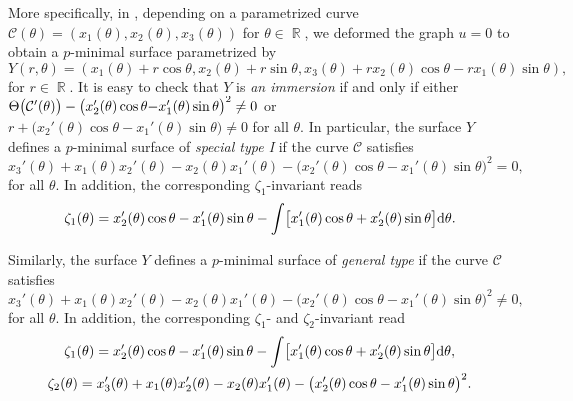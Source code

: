 \documentclass[pdftex]{sigma}
\numberwithin{equation}{section}
\DeclareMathOperator{\R}{\mathbb R}
\begin{document}
More specifically, in \cite[Section 9]{ChiuH/LiuH:2022}, depending on a parametrized curve $\mathcal{C}(\theta)=(x_{1}(\theta), x_{2}(\theta), x_{3}(\theta))$ for $\theta\in\R$, we deformed the graph $u=0$ to obtain a $p$-minimal surface parametrized by
 \begin{equation*}%
 Y(r,\theta)=(x_{1}(\theta)+r\cos{\theta},x_{2}(\theta)+r\sin{\theta},x_{3}(\theta)+rx_{2}(\theta)\cos{\theta}-rx_{1}(\theta)\sin{\theta}),
 \end{equation*}
for $r\in\R$. It is easy to check that $Y$ is \emph{an immersion} if and only if either $\Theta\bigl(\mathcal{C}'(\theta)\bigr)-\bigl(x_{2}'(\theta)\cos{\theta}\smash{-x_{1}'(\theta)\sin{\theta}\bigr)^{2}\neq 0}$ or $r+\bigl(x_{2}'(\theta)\cos{\theta}-x_{1}'(\theta)\sin{\theta}\bigr)\neq 0$ for all $\theta$.
In particular, the surface $Y$ defines a $p$-minimal surface of \emph{special type I} if the curve $\mathcal{C}$ satisfies
\begin{equation*}%
x_{3}'(\theta)+x_{1}(\theta)x_{2}'(\theta)-x_{2}(\theta)x_{1}'(\theta)-\bigl(x_{2}'(\theta)\cos{\theta}-x_{1}'(\theta)\sin{\theta}\bigr)^2=0,
\end{equation*}
for all $\theta$.
In addition, the corresponding $\zeta_{1}$-invariant \cite[formula~(9.9)]{ChiuH/LiuH:2022} reads
\begin{equation}\label{713i}
\zeta_{1}(\theta)=x_{2}'(\theta)\cos{\theta}-x_{1}'(\theta)\sin{\theta}-\int \bigl[x_{1}'(\theta)\cos{\theta}+x_{2}'(\theta)\sin{\theta}\bigr]{\rm d}\theta.
\end{equation}

Similarly, the surface $Y$ defines a $p$-minimal surface of \emph{general type} if the curve $\mathcal{C}$ satisfies
\begin{equation*}%
x_{3}'(\theta)+x_{1}(\theta)x_{2}'(\theta)-x_{2}(\theta)x_{1}'(\theta)-\bigl(x_{2}'(\theta)\cos{\theta}-x_{1}'(\theta)\sin{\theta}\bigr)^2\neq 0,
\end{equation*}
for all $\theta$. In addition, the corresponding $\zeta_{1}$- and $\zeta_{2}$-invariant read
\begin{gather}
\zeta_{1}(\theta)=x_{2}'(\theta)\cos{\theta}-x_{1}'(\theta)\sin{\theta}-\int \bigl[x_{1}'(\theta)\cos{\theta}+x_{2}'(\theta)\sin{\theta}\bigr] {\rm d}\theta,\nonumber\\
\zeta_{2}(\theta)=x_{3}'(\theta)+x_{1}(\theta)x_{2}'(\theta)-x_{2}(\theta)x_{1}'(\theta)-\bigl(x_{2}'(\theta)\cos{\theta}-x_{1}'(\theta)\sin{\theta}\bigr)^2\label{714i}
.
\end{gather}
\end{document}
